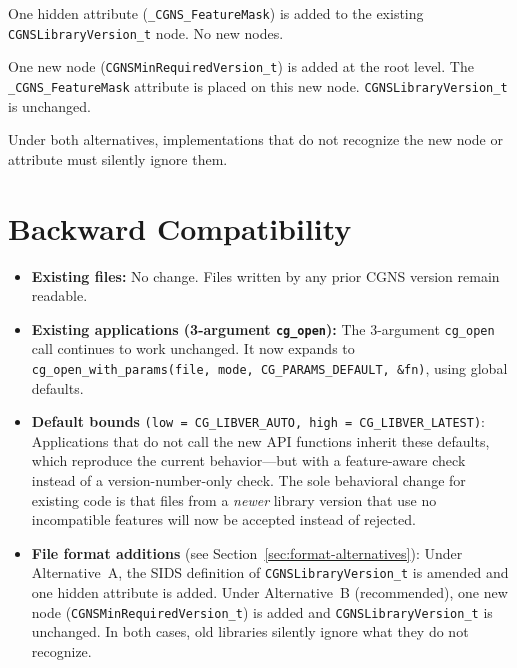 \documentclass[11pt,letterpaper]{article}
\begin{document}
\begin{description}[leftmargin=2em]
\item[Alternative A.]  One hidden attribute
  (\texttt{\_CGNS\_FeatureMask}) is added to the existing
  \texttt{CGNSLibraryVersion\_t} node.  No new nodes.

\item[Alternative B (recommended).]  One new node
  (\texttt{CGNSMinRequiredVersion\_t}) is added at the root level.
  The \texttt{\_CGNS\_FeatureMask} attribute is placed on this new
  node.  \texttt{CGNSLibraryVersion\_t} is unchanged.
\end{description}

Under both alternatives, implementations that do not recognize the
new node or attribute must silently ignore them.

\section{Backward Compatibility}

\begin{itemize}[leftmargin=2em]
\item \textbf{Existing files:}  No change.  Files written by any
  prior CGNS version remain readable.
\item \textbf{Existing applications (3-argument \texttt{cg\_open}):}
  The 3-argument \texttt{cg\_open} call continues to work unchanged.
  It now expands to \texttt{cg\_open\_with\_params(file, mode,
  CG\_PARAMS\_DEFAULT, \&fn)}, using global defaults.
\item \textbf{Default bounds}
  \texttt{(low~=~CG\_LIBVER\_AUTO, high~=~CG\_LIBVER\_LATEST)}:
  Applications that do not call the new API functions inherit these
  defaults, which reproduce the current behavior---but with a
  feature-aware check instead of a version-number-only check.  The
  sole behavioral change for existing code is that files from a
  \emph{newer} library version that use no incompatible features will
  now be accepted instead of rejected.
\item \textbf{File format additions} (see
  Section~\ref{sec:format-alternatives}): Under Alternative~A, the
  SIDS definition of \texttt{CGNSLibraryVersion\_t} is amended and
  one hidden attribute is added.  Under Alternative~B (recommended),
  one new node (\texttt{CGNSMinRequiredVersion\_t}) is added and
  \texttt{CGNSLibraryVersion\_t} is unchanged.  In both cases, old
  libraries silently ignore what they do not recognize.
\end{itemize}
\end{document}
